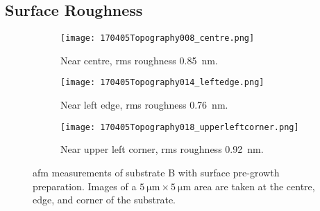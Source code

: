 \subsection{Surface Roughness}
\begin{figure}[htbp]
    \centering
    \begin{subfigure}[t]{\linewidth}
    \centering
        \texttt{[image: 170405Topography008\_centre.png]}
        \caption{Near centre, \ac{rms} roughness \SI{0.85}{\nano\metre}.}%
    \end{subfigure}%
    \par\bigskip
    \begin{subfigure}[t]{\linewidth}
    \centering
        \texttt{[image: 170405Topography014\_leftedge.png]}
        \caption{Near left edge, \ac{rms} roughness \SI{0.76}{\nano\metre}.}%
    \end{subfigure}%
    \par\bigskip
    \begin{subfigure}[t]{\linewidth}
    \centering
        \texttt{[image: 170405Topography018\_upperleftcorner.png]}
        \caption{Near upper left corner, \ac{rms} roughness \SI{0.92}{\nano\metre}.} %
    \end{subfigure}%
    \caption[\Ac{afm} of substrate B with surface pre-growth preparation.]{\Acf{afm} measurements of substrate B with surface pre-growth preparation. Images of a $\SI{5}{\micro\metre}\times\SI{5}{\micro\metre}$ area are taken at the centre, edge, and corner of the substrate.}\label{fig:afm_subBb}
\end{figure} %


